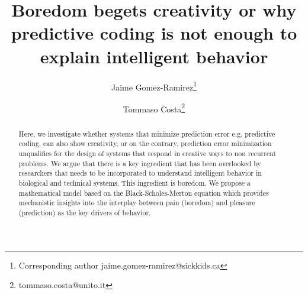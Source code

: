 \documentclass[11pt, onecolumn]{article}
\begin{document}
\title{Boredom begets creativity or why predictive coding is not enough to explain intelligent behavior}

\author[1]{Jaime Gomez-Ramirez\thanks{Corresponding author \hspace{0.6cm} jaime.gomez-ramirez@sickkids.ca}}
\author[2]{Tommaso Costa\thanks{\hspace{0.6cm} tommaso.costa@unito.it}}

\date{}
\maketitle

\begin{abstract}
Here, we investigate whether systems that minimize prediction error e.g. predictive coding, can also show creativity, or on the contrary, prediction error minimization unqualifies for the design of systems that respond in creative ways to non recurrent problems. 
We argue that there is a key ingredient that has been overlooked by researchers that needs to be incorporated to understand intelligent behavior in biological and technical systems. This ingredient is boredom. We propose a mathematical model based on the Black-Scholes-Merton equation which provides mechanistic insights into the interplay between pain (boredom) and pleasure (prediction) as the key drivers of behavior.
\end{abstract}
\end{document}
